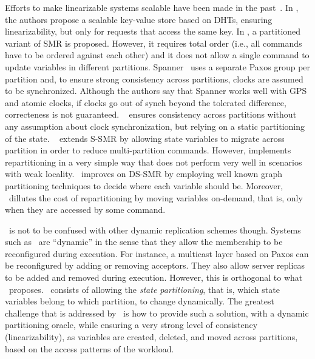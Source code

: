 Efforts to make linearizable systems scalable have been made in the past~\cite{corbett2013spanner, bezerra2014ssmr, le2016dssmr, Glendenning2011, Marandi11}.
In \cite{Glendenning2011}, the authors propose a scalable key-value store based on DHTs, ensuring linearizability, but only for requests that access the same key. 
In \cite{Marandi11}, a partitioned variant of SMR is proposed.
However, it requires total order (i.e., all commands have to be ordered against each other) and it does not allow a single command to update variables in different partitions.
Spanner~\cite{corbett2013spanner} uses a separate Paxos group per partition and, to ensure strong consistency across partitions, clocks are assumed to be synchronized.
Although the authors say that Spanner works well with GPS and atomic clocks, if clocks go out of synch beyond the tolerated difference, correcteness is not guaranteed.
\ssmr{}~\cite{bezerra2014ssmr} ensures consistency across partitions without any assumption about clock synchronization, but relying on a static partitioning of the state.
\dssmr{}~\cite{le2016dssmr} extends S-SMR by allowing state variables to migrate across partition in order to reduce multi-partition commands.
However, \dssmr{} implements repartitioning in a very simple way that does not perform very well in scenarios with weak locality.
\dynastar\ improves on DS-SMR by employing well known graph partitioning techniques to decide where each variable should be.
Moreover, \dynastar\ dillutes the cost of repartitioning by moving variables on-demand, that is, only when they are accessed by some command.

\dynastar\ is not to be confused with other dynamic replication schemes though.
Systems such as~\cite{birman2010dsr,guessoum2003dar,dustdar2007soc} are ``dynamic'' in the sense that they allow the membership to be reconfigured during execution.
For instance, a multicast layer based on Paxos can be reconfigured by adding or removing acceptors. They also allow server replicas to be added and removed during execution.
However, this is orthogonal to what \dynastar\ proposes.
\dynastar\ consists of allowing the \emph{state partitioning}, that is, which state variables belong to which partition, to change dynamically.
The greatest challenge that is addressed by \dynastar\ is how to provide such a solution, with a dynamic partitioning oracle, while ensuring a very strong level of consistency (linearizability), as variables are created, deleted, and moved across partitions, based on the access patterns of the workload.

